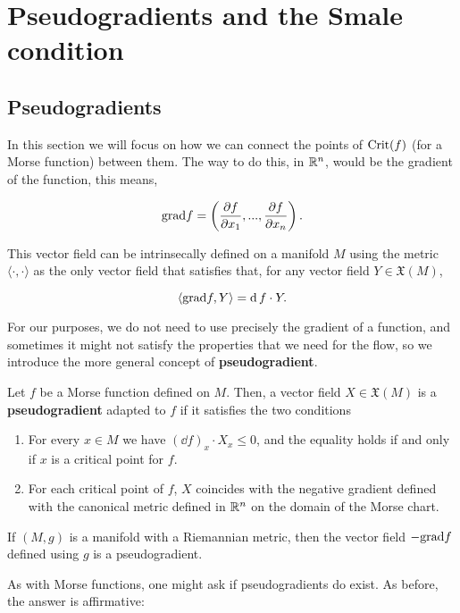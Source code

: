 \section{Pseudogradients and the Smale condition}

\subsection{Pseudogradients}

In this section we will focus on how we can connect the points of $\text{Crit}(f)$ (for a Morse function) between them. The way to do this, in $\mathbb{R}^n$, would be the gradient of the function, this means,

$$\text{grad} f = \left( \frac{\partial f}{\partial x_1},...,\frac{\partial f}{\partial x_n} \right) .$$

This vector field can be intrinsecally defined on a manifold $M$ using the metric $\langle \cdot , \cdot \rangle$ as the only vector field that satisfies that, for any vector field $Y \in \mathfrak{X}(M)$,

$$\langle \text{grad} f, Y \rangle = \operatorname d f \cdot Y .$$

For our purposes, we do not need to use precisely the gradient of a function, and sometimes it might not satisfy the properties that we need for the flow, so we introduce the more general concept of {\bf pseudogradient}.

\begin{deff}
Let $f$ be a Morse function defined on $M$. Then, a vector field $X \in \mathfrak{X}(M)$ is a {\bf pseudogradient} adapted to $f$ if it satisfies the two conditions

\begin{enumerate}
\item For every $x \in M$ we have $(\dd f)_x \cdot X_x \leq 0$, and the equality holds if and only if $x$ is a critical point for $f$.
\item For each critical point of $f$, $X$ coincides with the negative gradient defined with the canonical metric defined in $\mathbb{R}^n$ on the domain of the Morse chart.
\end{enumerate}
\end{deff}

\begin{rmrk}
If $(M,g)$ is a manifold with a Riemannian metric, then the vector field $- \text{grad} f$ defined using $g$ is a pseudogradient.
\end{rmrk}

As with Morse functions, one might ask if pseudogradients do exist. As before, the answer is affirmative:


